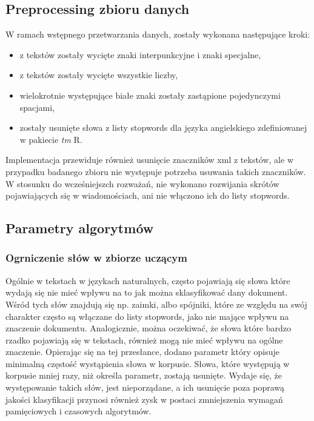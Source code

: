 \documentclass[a4paper,12pt]{article}
\begin{document}
\subsection{Preprocessing zbioru danych}

W ramach wstępnego przetwarzania danych, zostały wykonana następujące kroki:

\begin{itemize}
\item z tekstów zostały wycięte znaki interpunkcyjne i znaki specjalne,
\item z tekstów zostały wycięte wszystkie liczby,
\item wielokrotnie występujące białe znaki zostały zastąpione pojedynczymi spacjami,
\item zostały usunięte słowa z listy stopwords dla języka angielskiego zdefiniowanej w pakiecie \textit{tm} R.
\end{itemize}

Implementacja przewiduje również usunięcie znaczników xml z tekstów, ale w przypadku badanego zbioru nie występuje potrzeba usuwania takich znaczników. W stosunku do wcześniejszch rozważań, nie wykonano rozwijania skrótów pojawiających się w wiadomościach, ani nie włączono ich do listy stopwords.

\subsection{Parametry algorytmów} %

\subsubsection{Ogrniczenie słów w zbiorze uczącym}

Ogólnie w tekstach w językach naturalnych, często pojawiają się słowa które wydają się nie mieć wpływu na to jak można sklasyfikować dany dokument. Wśród tych słów znajdują się np. zaimki, albo spójniki, które ze względu na swój charakter często są włączane do listy stopwords, jako nie mające wpływu na znaczenie dokumentu. Analogicznie, można oczekiwać, że słowa które bardzo rzadko pojawiają się w tekstach, również mogą nie mieć wpływu
na ogólne znaczenie. Opierając się na tej przesłance, dodano parametr który opisuje minimalną częstość wystąpienia słowa w korpusie. Słowa, które
występują w korpusie mniej razy, niż określa parametr, zostają usunięte. Wydaje się, że występowanie takich słów, jest nieporządane, a ich usunięcie
poza poprawą jakości klasyfikacji przynosi również zysk w postaci zmniejszenia wymagań pamięciowych i czasowych algorytmów.\\
\end{document}
